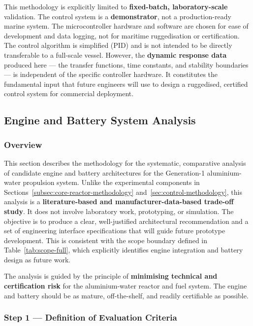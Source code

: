 \documentclass[12pt]{article}
\begin{document}
This methodology is explicitly limited to \textbf{fixed-batch, laboratory-scale} 
validation. The control system is a \textbf{demonstrator}, not a production-ready 
marine system. The microcontroller hardware and software are chosen for ease of 
development and data logging, not for maritime ruggedisation or certification. The 
control algorithm is simplified (PID) and is not intended to be directly 
transferable to a full-scale vessel. However, the \textbf{dynamic response data} 
produced here --- the transfer functions, time constants, and stability boundaries
--- is independent of the specific controller hardware. It constitutes the 
fundamental input that future engineers will use to design a ruggedised, certified 
control system for commercial deployment.

\break

\subsection{Engine and Battery System Analysis}
\label{sec:engine-methodology}

\subsubsection*{Overview}

This section describes the methodology for the systematic, comparative analysis of candidate engine and battery architectures for the Generation-1 aluminium-water propulsion system. Unlike the experimental components in Sections~\ref{subsec:core-reactor-methodology} and~\ref{sec:control-methodology}, this analysis is a \textbf{literature-based and manufacturer-data-based trade-off study}. It does not involve laboratory work, prototyping, or simulation. The objective is to produce a clear, well-justified architectural recommendation and a set of engineering interface specifications that will guide future prototype development. This is consistent with the scope boundary defined in Table~\ref{tab:scope-full}, which explicitly identifies engine integration and battery design as future work.

The analysis is guided by the principle of \textbf{minimising technical and certification risk} for the aluminium-water reactor and fuel system. The engine and battery should be as mature, off-the-shelf, and readily certifiable as possible.

\subsubsection*{Step 1 — Definition of Evaluation Criteria}
\end{document}
